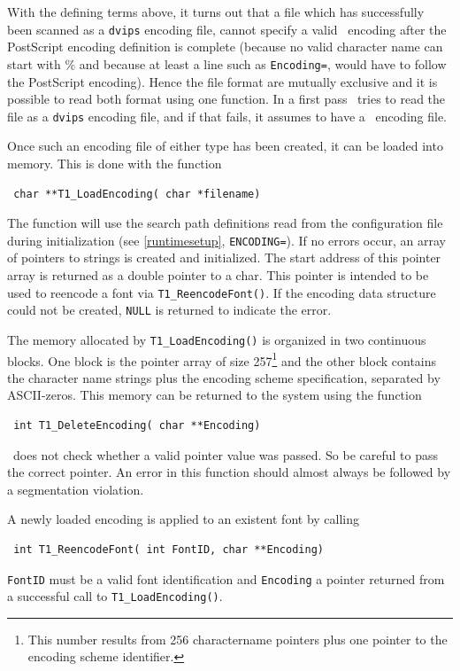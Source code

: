 With the defining terms above, it turns out that a file which has successfully
been scanned as a \verb+dvips+ encoding file, cannot specify a valid \tonelib\
encoding after the PostScript encoding definition is complete (because no
valid character name can start with \% and because at least a line such as
\verb+Encoding=+, would have to follow the PostScript encoding). Hence the
file format are mutually exclusive and it is possible to read both format
using one function. In a first pass \tonelib\ tries to read the file as a
\verb+dvips+ encoding file, and if that fails, it assumes to have a \tonelib\
encoding file. 


Once such an encoding file of either type has been created, it can be loaded
into memory. This is done with the function
\precorr
\begin{verbatim}
 char **T1_LoadEncoding( char *filename)
\end{verbatim}\postcorr
The function will use the search path definitions read from
the configuration file during initialization (see
\ref{runtimesetup}, \verb+ENCODING=+). If no
errors occur, an array of pointers to strings is created and
initialized. The start address of this pointer array is returned as a
double pointer to a char. This pointer is intended
to be used to reencode a font via \verb+T1_ReencodeFont()+. If the encoding
data structure could not be created, \verb+NULL+ is returned to indicate the
error. 

The memory allocated by \verb+T1_LoadEncoding()+ is organized in two
continuous blocks. One block is the pointer array of size 257\footnote{This
  number results from 256 charactername pointers plus one pointer to the
  encoding scheme identifier.} and the
other block contains the character name strings plus the encoding scheme
specification, separated by
ASCII-zeros. 
This memory can be returned to the system using the function 
\precorr
\begin{verbatim}
 int T1_DeleteEncoding( char **Encoding)
\end{verbatim}\postcorr
\tonelib\ does not check whether a valid pointer value was passed. So be
careful to pass the correct pointer. An error in this function should almost
always be followed by a segmentation violation.

A newly loaded encoding is applied to an existent font by
calling 
\precorr
\begin{verbatim}
 int T1_ReencodeFont( int FontID, char **Encoding)
\end{verbatim}\postcorr
\verb+FontID+ must be a valid font identification and
\verb+Encoding+ a pointer returned from a
successful call to \verb+T1_LoadEncoding()+. 

